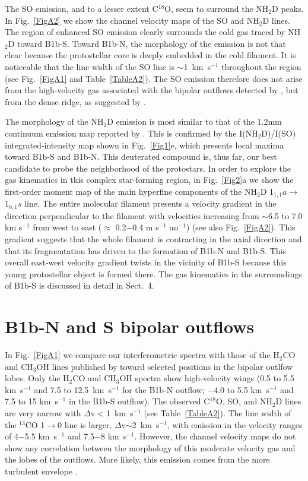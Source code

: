 \documentclass[letter]{aa}
\begin{document}
The SO emission, and to a lesser extent C$^{18}$O, seem to surround the NH$_2$D peaks.
In Fig.~\ref{FigA2} we show the channel velocity maps of the SO and NH$_2$D lines.
The region of enhanced SO emission
clearly surrounds the cold gas traced by NH$_2$D toward B1b-S. Toward B1b-N, the
morphology of the emission is not that clear because the protostellar
core is deeply embedded in the cold filament. It is noticeable that the line width of the SO
line is $\sim$1~km~s$^{-1}$ throughout the region (see Fig.~\ref{FigA1} and Table~\ref{TableA2}). 
The SO emission therefore does not arise from the high-velocity gas associated with the 
bipolar outflows detected by \citet{Gerin15}, but from the dense ridge, as suggested by \citet{Fuente16}. 
 
The morphology of the NH$_2$D emission is most similar to 
that of the 1.2mm continuum emission map reported by \citet{Daniel13}.  
This is confirmed by the  I(NH$_2$D)/I(SO) integrated-intensity map shown in Fig.~\ref{Fig1}e, 
which presents local maxima toward B1b-S and B1b-N.
This deuterated compound is, thus far, our best candidate to probe the neighborhood of the protostars.
In order to explore the gas kinematics in this complex star-forming region, in Fig.~\ref{Fig2}a we show 
the first-order moment map of the main hyperfine 
components of the NH$_2$D 1$_{1,1}a$$\rightarrow$1$_{0,1}s$ line.
The entire molecular filament presents a velocity gradient in the direction perpendicular to
the filament with velocities increasing from  $\sim$6.5 to 7.0 km s$^{-1}$ from
west to east ($\approx$ 0.2$-$0.4 m s$^{-1}$ au$^{-1}$) (see also Fig.~\ref{FigA2}).
This gradient suggests that the whole filament is contracting in the axial direction
and that its fragmentation has driven to the formation of B1b-N and B1b-S. 
This overall east-west velocity gradient twists in the vicinity of B1b-S
because this young protostellar object is formed there. The gas kinematics in the surroundings 
of B1b-S is discussed in detail in Sect.~4. 

\section{B1b-N and S bipolar outflows}
In Fig.~\ref{FigA1} we compare our interferometric spectra with those of the H$_2$CO and 
CH$_3$OH lines published by \citet{Gerin15} toward selected positions in the bipolar outlfow lobes. 
Only the H$_2$CO and CH$_3$OH spectra show high-velocity wings (0.5 to 5.5 km~s$^{-1}$ and 7.5 to 12.5~km~s$^{-1}$
for the B1b-N outflow; $-$4.0 to 5.5 km~s$^{-1}$ and  7.5 to 15 km~s$^{-1}$ in the B1b-S outflow).
The observed C$^{18}$O, SO, and NH$_2$D lines are very narrow with $\Delta$v$<$1~km~s$^{-1}$
(see Table~\ref{TableA2}).
The line width of the $^{13}$CO 1$\rightarrow$0 line is larger, $\Delta$v$\sim$2~km~s$^{-1}$, with emission
in the velocity ranges of 4$-$5.5 km~s$^{-1}$ and 7.5$-$8 km~s$^{-1}$. However,
the channel velocity maps do not show any correlation between the morphology of this moderate velocity gas and 
the lobes of the outflows. More likely, this emission comes from the more turbulent envelope \citep{Daniel13}.
\end{document}
